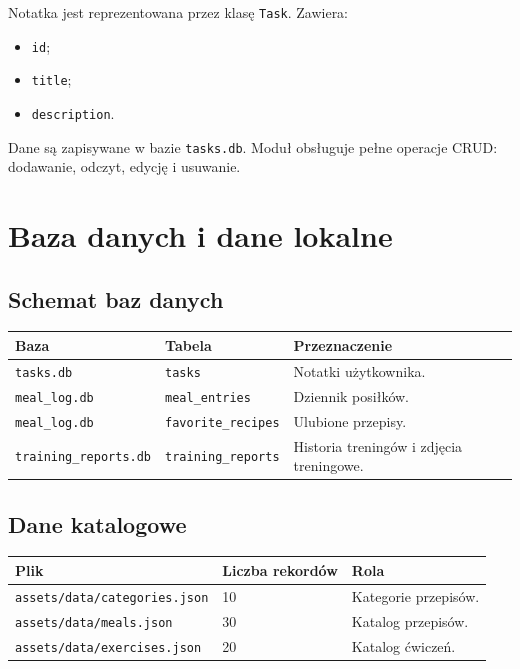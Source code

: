 \documentclass[12pt,a4paper]{article}
\begin{document}
Notatka jest reprezentowana przez klasę \texttt{Task}. Zawiera:

\begin{itemize}
    \item \texttt{id};
    \item \texttt{title};
    \item \texttt{description}.
\end{itemize}

Dane są zapisywane w bazie \texttt{tasks.db}. Moduł obsługuje pełne operacje CRUD: dodawanie, odczyt, edycję i usuwanie.

\section{Baza danych i dane lokalne}

\subsection{Schemat baz danych}

\begin{longtable}{p{}p{}p{}}
\toprule
\textbf{Baza} & \textbf{Tabela} & \textbf{Przeznaczenie} \\
\midrule
\texttt{tasks.db} & \texttt{tasks} & Notatki użytkownika. \\
\texttt{meal\_log.db} & \texttt{meal\_entries} & Dziennik posiłków. \\
\texttt{meal\_log.db} & \texttt{favorite\_recipes} & Ulubione przepisy. \\
\texttt{training\_reports.db} & \texttt{training\_reports} & Historia treningów i zdjęcia treningowe. \\
\bottomrule
\end{longtable}

\subsection{Dane katalogowe}

\begin{longtable}{p{}p{}p{}}
\toprule
\textbf{Plik} & \textbf{Liczba rekordów} & \textbf{Rola} \\
\midrule
\texttt{assets/data/categories.json} & 10 & Kategorie przepisów. \\
\texttt{assets/data/meals.json} & 30 & Katalog przepisów. \\
\texttt{assets/data/exercises.json} & 20 & Katalog ćwiczeń. \\
\bottomrule
\end{longtable}
\end{document}
